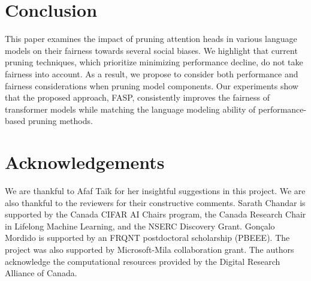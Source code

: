 \documentclass[letterpaper]{article} %
\begin{document}
\section{Conclusion}
This paper examines the impact of pruning attention heads in various language models on their fairness towards several social biases. %
We highlight that current pruning techniques, which prioritize minimizing performance decline, do not take fairness into account. As a result, we propose to consider both performance and fairness considerations when pruning model components. Our experiments show that the proposed approach, FASP, consistently improves the fairness of transformer models while matching the language modeling ability of performance-based pruning methods.%

\section*{Acknowledgements} 

We are thankful to Afaf Taïk for her insightful suggestions in this project. We are also thankful to the reviewers for their constructive comments. Sarath Chandar is supported by the Canada CIFAR AI Chairs program, the Canada Research Chair in Lifelong Machine Learning, and the NSERC Discovery Grant. Gonçalo Mordido is supported by an FRQNT postdoctoral scholarship (PBEEE). The project was also supported by Microsoft-Mila collaboration grant. The authors acknowledge the computational resources provided by the Digital Research Alliance of Canada. 





\end{document}
